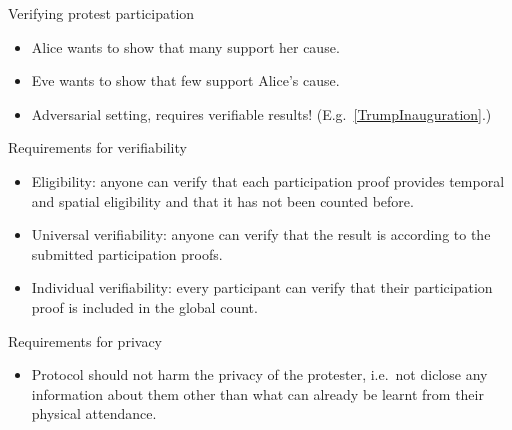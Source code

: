 \begin{columns}[t]

  \begin{column}{0.32\linewidth}

    \begin{redblock}{Verifying protest participation}
      \begin{itemize}
        \item Alice wants to show that many support her cause.
        \item Eve wants to show that few support Alice's cause.
        \item {\color{red} Adversarial setting, requires verifiable results!}
          (E.g.\ \cref{TrumpInauguration}.)
      \end{itemize}
    \end{redblock}

    \begin{blueblock}{Requirements for verifiability}
      \begin{itemize}
        \item\label{EligibilityVerif} Eligibility: anyone can verify that each 
          participation proof provides temporal and spatial eligibility and that 
          it has not been counted before.

        \item\label{UniversalVerif} Universal verifiability: anyone can verify 
          that the result is according to the submitted participation proofs.

        \item\label{IndividualVerif} Individual verifiability: every participant 
          can verify that their participation proof is included in the global 
          count.
      \end{itemize}
    \end{blueblock}

    \begin{blueblock}{Requirements for privacy}
      \begin{itemize}
        \item Protocol should not harm the privacy of the protester, i.e.\  not 
          diclose any information about them other than what can already be 
          learnt from their physical attendance.
      \end{itemize}
    \end{blueblock}

  \end{column}


\end{columns}
